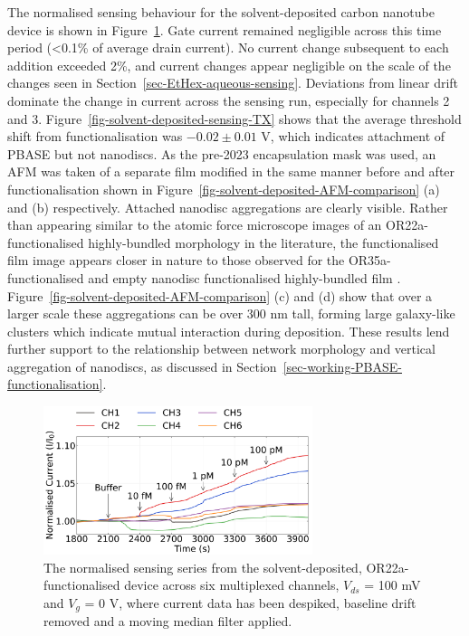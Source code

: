 \documentclass[
  a4paper,
]{scrbook}
\begin{document}
The normalised sensing behaviour for the solvent-deposited carbon
nanotube device is shown in Figure~\ref{fig-solvent-deposited-sensing}.
Gate current remained negligible across this time period (\textless0.1\%
of average drain current). No current change subsequent to each addition
exceeded 2\%, and current changes appear negligible on the scale of the
changes seen in Section~\ref{sec-EtHex-aqueous-sensing}. Deviations from
linear drift dominate the change in current across the sensing run,
especially for channels 2 and 3.
Figure~\ref{fig-solvent-deposited-sensing-TX} shows that the average
threshold shift from functionalisation was \(-0.02 \pm 0.01\) V, which
indicates attachment of PBASE but not nanodiscs. As the pre-2023
encapsulation mask was used, an AFM was taken of a separate film
modified in the same manner before and after functionalisation shown in
Figure~\ref{fig-solvent-deposited-AFM-comparison} (a) and (b)
respectively. Attached nanodisc aggregations are clearly visible. Rather
than appearing similar to the atomic force microscope images of an
OR22a-functionalised highly-bundled morphology in the literature, the
functionalised film image appears closer in nature to those observed for
the OR35a-functionalised and empty nanodisc functionalised
highly-bundled film \autocite{Murugathas2019a}.
Figure~\ref{fig-solvent-deposited-AFM-comparison} (c) and (d) show that
over a larger scale these aggregations can be over 300 nm tall, forming
large galaxy-like clusters which indicate mutual interaction during
deposition. These results lend further support to the relationship
between network morphology and vertical aggregation of nanodiscs, as
discussed in Section~\ref{sec-working-PBASE-functionalisation}.

\begin{figure}

{\centering \includegraphics[width=0.7\textwidth,height=\textheight]{figures/ch7/NTQ25C5_OR22a_sample_220126_filtered_detrend_trunc_arrows_normalised.png}

}

\caption[The normalised and filtered sensing series from a
solvent-deposited, OR22a-functionalised device across six multiplexed
channels.]{\label{fig-solvent-deposited-sensing}The normalised sensing
series from the solvent-deposited, OR22a-functionalised device across
six multiplexed channels, \(V_{ds}\) = 100 mV and \(V_g\) = 0 V, where
current data has been despiked, baseline drift removed and a moving
median filter applied.}

\end{figure}
\end{document}
